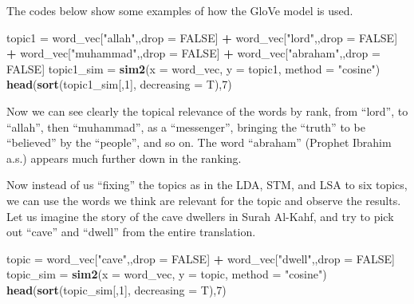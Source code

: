 \documentclass[
]{article}
\newenvironment{Shaded}{\begin{snugshade}}{\end{snugshade}}
\newcommand{\AttributeTok}[1]{\textcolor[rgb]{0.13,0.29,0.53}{#1}}
\newcommand{\ConstantTok}[1]{\textcolor[rgb]{0.56,0.35,0.01}{#1}}
\newcommand{\DecValTok}[1]{\textcolor[rgb]{0.00,0.00,0.81}{#1}}
\newcommand{\FunctionTok}[1]{\textcolor[rgb]{0.13,0.29,0.53}{\textbf{#1}}}
\newcommand{\NormalTok}[1]{#1}
\newcommand{\OtherTok}[1]{\textcolor[rgb]{0.56,0.35,0.01}{#1}}
\newcommand{\SpecialCharTok}[1]{\textcolor[rgb]{0.81,0.36,0.00}{\textbf{#1}}}
\newcommand{\StringTok}[1]{\textcolor[rgb]{0.31,0.60,0.02}{#1}}
\begin{document}
The codes below show some examples of how the GloVe model is used.

\footnotesize

\begin{Shaded}
\begin{Highlighting}[]
\NormalTok{topic1 }\OtherTok{=}\NormalTok{ word\_vec[}\StringTok{"allah"}\NormalTok{,,drop }\OtherTok{=} \ConstantTok{FALSE}\NormalTok{] }\SpecialCharTok{+} 
\NormalTok{         word\_vec[}\StringTok{"lord"}\NormalTok{,,drop }\OtherTok{=} \ConstantTok{FALSE}\NormalTok{] }\SpecialCharTok{+} 
\NormalTok{         word\_vec[}\StringTok{"muhammad"}\NormalTok{,,drop }\OtherTok{=} \ConstantTok{FALSE}\NormalTok{] }\SpecialCharTok{+}
\NormalTok{         word\_vec[}\StringTok{"abraham"}\NormalTok{,,drop }\OtherTok{=} \ConstantTok{FALSE}\NormalTok{]}
\NormalTok{topic1\_sim }\OtherTok{=} \FunctionTok{sim2}\NormalTok{(}\AttributeTok{x =}\NormalTok{ word\_vec, }\AttributeTok{y =}\NormalTok{ topic1, }\AttributeTok{method =} \StringTok{"cosine"}\NormalTok{)}
\FunctionTok{head}\NormalTok{(}\FunctionTok{sort}\NormalTok{(topic1\_sim[,}\DecValTok{1}\NormalTok{], }\AttributeTok{decreasing =}\NormalTok{ T),}\DecValTok{7}\NormalTok{)}
\end{Highlighting}
\end{Shaded}

\normalsize

Now we can see clearly the topical relevance of the words by rank, from ``lord'', to ``allah'', then ``muhammad'', as a ``messenger'', bringing the ``truth'' to be ``believed'' by the ``people'', and so on. The word ``abraham'' (Prophet Ibrahim a.s.) appears much further down in the ranking.

Now instead of us ``fixing'' the topics as in the LDA, STM, and LSA to six topics, we can use the words we think are relevant for the topic and observe the results. Let us imagine the story of the cave dwellers in Surah Al-Kahf, and try to pick out ``cave'' and ``dwell'' from the entire translation.

\footnotesize

\begin{Shaded}
\begin{Highlighting}[]
\NormalTok{topic }\OtherTok{=}\NormalTok{ word\_vec[}\StringTok{"cave"}\NormalTok{,,drop }\OtherTok{=} \ConstantTok{FALSE}\NormalTok{] }\SpecialCharTok{+}\NormalTok{ word\_vec[}\StringTok{"dwell"}\NormalTok{,,drop }\OtherTok{=} \ConstantTok{FALSE}\NormalTok{]}
\NormalTok{topic\_sim }\OtherTok{=} \FunctionTok{sim2}\NormalTok{(}\AttributeTok{x =}\NormalTok{ word\_vec, }\AttributeTok{y =}\NormalTok{ topic, }\AttributeTok{method =} \StringTok{"cosine"}\NormalTok{)}
\FunctionTok{head}\NormalTok{(}\FunctionTok{sort}\NormalTok{(topic\_sim[,}\DecValTok{1}\NormalTok{], }\AttributeTok{decreasing =}\NormalTok{ T),}\DecValTok{7}\NormalTok{)}
\end{Highlighting}
\end{Shaded}
\end{document}
